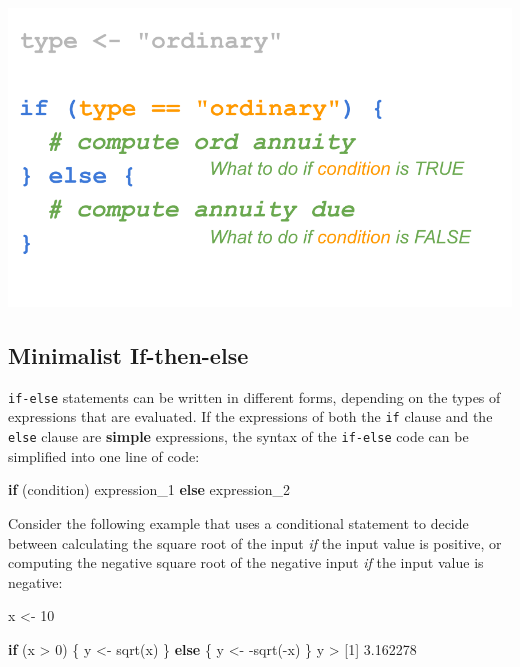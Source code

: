 \documentclass[
]{book}
\newenvironment{Shaded}{\begin{snugshade}}{\end{snugshade}}
\newcommand{\ControlFlowTok}[1]{\textcolor[rgb]{0.13,0.29,0.53}{\textbf{#1}}}
\newcommand{\DecValTok}[1]{\textcolor[rgb]{0.00,0.00,0.81}{#1}}
\newcommand{\FloatTok}[1]{\textcolor[rgb]{0.00,0.00,0.81}{#1}}
\newcommand{\FunctionTok}[1]{\textcolor[rgb]{0.00,0.00,0.00}{#1}}
\newcommand{\NormalTok}[1]{#1}
\newcommand{\OtherTok}[1]{\textcolor[rgb]{0.56,0.35,0.01}{#1}}
\newcommand{\SpecialCharTok}[1]{\textcolor[rgb]{0.00,0.00,0.00}{#1}}
\begin{document}
\begin{center}\includegraphics[width=0.5\linewidth]{images/conditionals/if-else-anatomy-6} \end{center}

\hypertarget{minimalist-if-then-else}{%
\subsection{Minimalist If-then-else}\label{minimalist-if-then-else}}

\texttt{if-else} statements can be written in different forms, depending on the types
of expressions that are evaluated. If the expressions of both the \texttt{if} clause
and the \texttt{else} clause are \textbf{simple} expressions, the syntax of the \texttt{if-else}
code can be simplified into one line of code:

\begin{Shaded}
\begin{Highlighting}[]
\ControlFlowTok{if}\NormalTok{ (condition) expression\_1 }\ControlFlowTok{else}\NormalTok{ expression\_2}
\end{Highlighting}
\end{Shaded}

Consider the following example that uses a conditional statement to decide
between calculating the square root of the input \emph{if} the input value is
positive, or computing the negative square root of the negative input \emph{if} the
input value is negative:

\begin{Shaded}
\begin{Highlighting}[]
\NormalTok{x }\OtherTok{\textless{}{-}} \DecValTok{10}

\ControlFlowTok{if}\NormalTok{ (x }\SpecialCharTok{\textgreater{}} \DecValTok{0}\NormalTok{) \{}
\NormalTok{  y }\OtherTok{\textless{}{-}} \FunctionTok{sqrt}\NormalTok{(x) }
\NormalTok{\} }\ControlFlowTok{else}\NormalTok{ \{}
\NormalTok{  y }\OtherTok{\textless{}{-}} \SpecialCharTok{{-}}\FunctionTok{sqrt}\NormalTok{(}\SpecialCharTok{{-}}\NormalTok{x)}
\NormalTok{\}}
\NormalTok{y}
\SpecialCharTok{\textgreater{}}\NormalTok{ [}\DecValTok{1}\NormalTok{] }\FloatTok{3.162278}
\end{Highlighting}
\end{Shaded}
\end{document}
